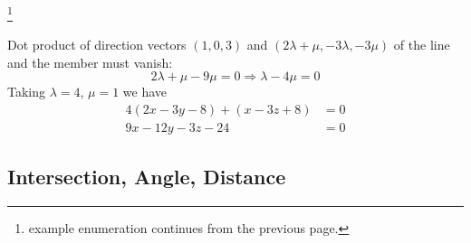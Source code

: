 \documentclass[11pt]{amsbook}
\begin{document}
\begin{exmp}
	\begin{hSolution}
		\footnote{example enumeration continues from the previous page.}
		\begin{hEnumerateAlpha}
			\item Dot product of direction vectors $(1, 0, 3)$ and $(2\lambda + \mu , -3\lambda, -3\mu)$ of the line and the member must vanish:
			\[
				2\lambda + \mu - 9\mu = 0 \Rightarrow \lambda - 4\mu = 0
			\]
			Taking $\lambda = 4$, $\mu = 1$ we have
			\begin{align*}
				4(2x - 3y - 8)+(x - 3z + 8) &= 0 \\
				9x - 12y - 3z - 24 &= 0
			\end{align*}
		\end{hEnumerateAlpha}
	\end{hSolution}
\end{exmp}

\subsection{Intersection, Angle, Distance}
\end{document}
